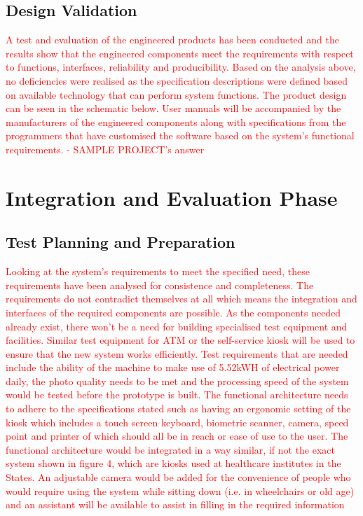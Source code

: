 \documentclass[a4paper,11pt,fleqn]{report}
\begin{document}
\subsection{Design Validation}
\textcolor{red}{A test and evaluation of the engineered products has been conducted and the results show that the engineered components meet the requirements with respect to functions, interfaces, reliability and producibility. Based on the analysis above, no deficiencies were realised as the specification descriptions were defined based on available technology that can perform system functions. The product design can be seen in the schematic below. User manuals will be accompanied by the manufacturers of the engineered components along with specifications from the programmers that have customised the software based on the system’s functional requirements. - SAMPLE PROJECT's answer}

\section{Integration and Evaluation Phase}

\subsection{Test Planning and Preparation}
\textcolor{red}{Looking at the system’s requirements to meet the specified need, these requirements have been analysed for consistence and completeness. The requirements do not contradict themselves at all which means the integration and interfaces of the required components are possible. As the components needed already exist, there won’t be a need for building specialised test equipment and facilities. Similar test equipment for ATM or the self-service kiosk will be used to ensure that the new system works efficiently. Test requirements that are needed include the ability of the machine to make use of 5.52kWH of electrical power daily, the photo quality needs to be met and the processing speed of the system would be tested before the prototype is built. The functional architecture needs to adhere to the specifications stated such as having an ergonomic setting of the kiosk which includes a touch screen keyboard, biometric scanner, camera, speed point and printer of which should all be in reach or ease of use to the user. The functional architecture would be integrated in a way similar, if not the exact system shown in figure 4, which are kiosks used at healthcare institutes in the States. An adjustable camera would be added for the convenience of people who would require using the system while sitting down (i.e. in wheelchairs or old age) and an assistant will be available to assist in filling in the required information}
\end{document}
